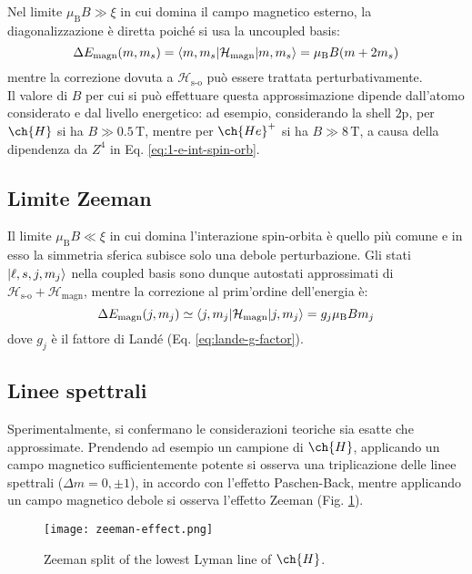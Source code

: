 Nel limite $ \mu_\text{B} B \gg \xi $ in cui domina il campo magnetico esterno, la diagonalizzazione è diretta poiché si usa la uncoupled basis:
\begin{equation}
	\Delta E_\text{magn}(m,m_s) = \braket{m,m_s | \mathcal{H}_\text{magn} | m,m_s} = \mu_\text{B} B (m + 2m_s)
\end{equation}
mentre la correzione dovuta a $ \mathcal{H}_\text{s-o} $ può essere trattata perturbativamente. \\
Il valore di $ B $ per cui si può effettuare questa approssimazione dipende dall'atomo considerato e dal livello energetico: ad esempio, considerando la shell $ \text{2p} $, per $ \ch{H} $ si ha $ B \gg 0.5 \,\text{T} $, mentre per $ \ch{He}^+ $ si ha $ B \gg 8 \,\text{T} $, a causa della dipendenza da $ Z^4 $ in Eq. \ref{eq:1-e-int-spin-orb}.

\subsection{Limite Zeeman}

Il limite $ \mu_\text{B} B \ll \xi $ in cui domina l'interazione spin-orbita è quello più comune e in esso la simmetria sferica subisce solo una debole perturbazione. Gli stati $ \ket{\ell,s,j,m_j} $ nella coupled basis sono dunque autostati approssimati di $ \mathcal{H}_\text{s-o} + \mathcal{H}_\text{magn} $, mentre la correzione al prim'ordine dell'energia è:
\begin{equation}
	\Delta E_\text{magn}(j,m_j) \simeq \braket{j,m_j | \mathcal{H}_\text{magn} | j,m_j} = g_j \mu_\text{B} B m_j
\end{equation}
dove $ g_j $ è il fattore di Landé (Eq. \ref{eq:lande-g-factor}).

\subsection{Linee spettrali}

Sperimentalmente, si confermano le considerazioni teoriche sia esatte che approssimate. Prendendo ad esempio un campione di $ \ch{H} $, applicando un campo magnetico sufficientemente potente si osserva una triplicazione delle linee spettrali ($ \Delta m = 0, \pm 1 $), in accordo con l'effetto Paschen-Back, mentre applicando un campo magnetico debole si osserva l'effetto Zeeman (Fig. \ref{zeeman-effect}).

\begin{figure}
	\centering
	\texttt{[image: zeeman-effect.png]}
	\caption{Zeeman split of the lowest Lyman line of $ \ch{H} $.}
	\label{zeeman-effect}
\end{figure}


